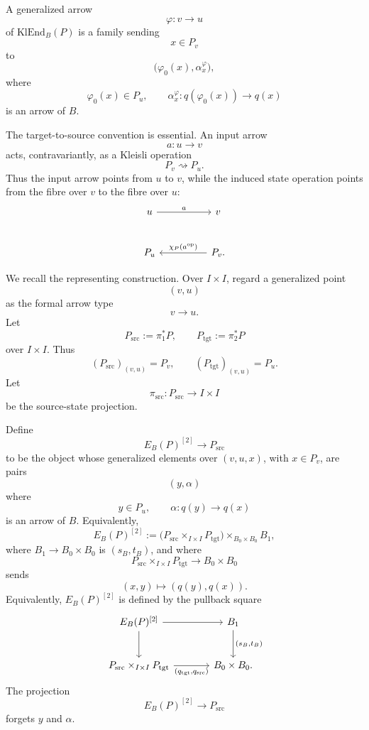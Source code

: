A generalized arrow
\[
        \varphi:v\longrightarrow u
\]
of \(\mathrm{KlEnd}_B(P)\) is a family sending
\[
        x\in P_v
\]
to
\[
        \bigl(\varphi_0(x),\alpha_x^\varphi\bigr),
\]
where
\[
        \varphi_0(x)\in P_u,
        \qquad
        \alpha_x^\varphi:q(\varphi_0(x))\longrightarrow q(x)
\]
is an arrow of \(B\).

The target-to-source convention is essential.  An input arrow
\[
        a:u\longrightarrow v
\]
acts, contravariantly, as a Kleisli operation
\[
        P_v\rightsquigarrow P_u.
\]
Thus the input arrow points from \(u\) to \(v\), while the induced state operation points from the
fibre over \(v\) to the fibre over \(u\):
\[
\begin{tikzcd}[column sep=huge,row sep=large]
u \ar[r,"a"] & v \\
P_u & P_v \ar[l,swap,"\chi_P(a^{\operatorname{op}})"] .
\end{tikzcd}
\]

We recall the representing construction.  Over \(I\times I\), regard a generalized point
\[
        (v,u)
\]
as the formal arrow type
\[
        v\longrightarrow u.
\]
Let
\[
        P_{\mathrm{src}}:=\pi_1^{\ast}P,
        \qquad
        P_{\mathrm{tgt}}:=\pi_2^{\ast}P
\]
over \(I\times I\).  Thus
\[
        (P_{\mathrm{src}})_{(v,u)}=P_v,
        \qquad
        (P_{\mathrm{tgt}})_{(v,u)}=P_u.
\]
Let
\[
        \pi_{\mathrm{src}}:P_{\mathrm{src}}\longrightarrow I\times I
\]
be the source-state projection.

Define
\[
        E_B(P)^{[2]}\longrightarrow P_{\mathrm{src}}
\]
to be the object whose generalized elements over \((v,u,x)\), with \(x\in P_v\), are pairs
\[
        (y,\alpha)
\]
where
\[
        y\in P_u,
        \qquad
        \alpha:q(y)\longrightarrow q(x)
\]
is an arrow of \(B\).  Equivalently,
\[
        E_B(P)^{[2]}
        :=
        \bigl(P_{\mathrm{src}}\times_{I\times I}P_{\mathrm{tgt}}\bigr)
        \times_{B_0\times B_0}
        B_1,
\]
where \(B_1\to B_0\times B_0\) is \((s_B,t_B)\), and where
\[
        P_{\mathrm{src}}\times_{I\times I}P_{\mathrm{tgt}}
        \longrightarrow B_0\times B_0
\]
sends
\[
        (x,y)\longmapsto(q(y),q(x)).
\]
Equivalently, \(E_B(P)^{[2]}\) is defined by the pullback square
\[
\begin{tikzcd}[column sep=large,row sep=large]
E_B(P)^{[2]}
\ar[r]
\ar[d]
&
B_1
\ar[d,"{(s_B,t_B)}"]
\\
P_{\mathrm{src}}\times_{I\times I}P_{\mathrm{tgt}}
\ar[r,swap,"{(q_{\mathrm{tgt}},q_{\mathrm{src}})}"]
&
B_0\times B_0 .
\end{tikzcd}
\]
The projection
\[
        E_B(P)^{[2]}\to P_{\mathrm{src}}
\]
forgets \(y\) and \(\alpha\).

